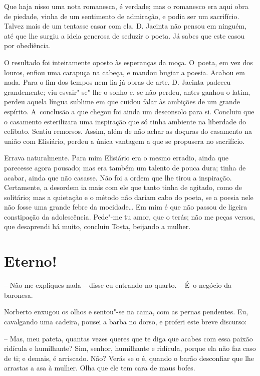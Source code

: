 Que haja nisso uma nota romanesca, é verdade; mas o romanesco era aqui
obra de piedade, vinha de um sentimento de admiração, e podia ser um
sacrifício. Talvez mais de um tentasse casar com ela. D. Jacinta não
pensou em ninguém, até que lhe surgiu a ideia generosa de seduzir o
poeta. Já sabes que este casou por obediência.

O resultado foi inteiramente oposto às esperanças da moça. O~poeta, em
vez dos louros, enfiou uma carapuça na cabeça, e mandou bugiar a poesia.
Acabou em nada. Para o fim dos tempos nem lia já obras de arte. D.
Jacinta padeceu grandemente; viu esvair"-se"-lhe o sonho e, se não perdeu,
antes ganhou o latim, perdeu aquela língua sublime em que cuidou falar
às ambições de um grande espírito. A~conclusão a que chegou foi ainda um
desconsolo para si. Concluiu que o casamento esterilizara uma inspiração
que só tinha ambiente na liberdade do celibato. Sentiu remorsos. Assim,
além de não achar as doçuras do casamento na união com Elisiário, perdeu
a única vantagem a que se propusera no sacrifício.

Errava naturalmente. Para mim Elisiário era o mesmo erradio, ainda que
parecesse agora pousado; mas era também um talento de pouca dura; tinha
de acabar, ainda que não casasse. Não foi a ordem que lhe tirou a
inspiração. Certamente, a desordem ia mais com ele que tanto tinha de
agitado, como de solitário; mas a quietação e o método não dariam cabo
do poeta, se a poesia nele não fosse uma grande febre da mocidade\ldots{} Em
mim é que não passou de ligeira constipação da adolescência. Pede"-me tu
amor, que o terás; não me peças versos, que desaprendi há muito,
concluiu Tosta, beijando a mulher.

\chapter{Eterno!}

-- Não me expliques nada -- disse eu entrando no quarto. -- É~o negócio
da baronesa.

Norberto enxugou os olhos e sentou"-se na cama, com as pernas pendentes.
Eu, cavalgando uma cadeira, pousei a barba no dorso, e proferi este
breve discurso:

-- Mas, meu pateta, quantas vezes queres que te diga que acabes com essa
paixão ridícula e humilhante? Sim, senhor, humilhante e ridícula, porque
ela não faz caso de ti; e demais, é arriscado. Não? Verás se o é, quando
o barão desconfiar que lhe arrastas a asa à mulher. Olha que ele tem
cara de maus bofes.

